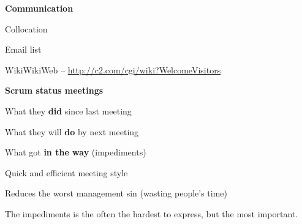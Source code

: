 \documentclass[landscape]{slides}
\renewcommand{\title}[1]{{\large\bfseries #1}}
\newenvironment{itemiz}%
  {\begin{list}{}{\raggedright
      \setlength{\itemsep}{2pt}%
      \setlength{\parskip}{4pt}\setlength{\parsep}{2pt}}}%
  {\end{list}}%
\begin{document}
 \begin{slide}
  \title{Communication}
  \begin{itemiz}
  \item Collocation
  \item Email list
  \item WikiWikiWeb --  \url{http://c2.com/cgi/wiki?WelcomeVisitors}
  \end{itemiz}
  \title{Scrum status meetings}
  \begin{itemiz}
  \item What they {\bf did} since last meeting
  \item What they will {\bf do} by next meeting
  \item What got {\bf in the way} (impediments)
  \end{itemiz}
  \begin{itemiz}
    \item Quick and efficient meeting style
    \item Reduces the worst management sin (wasting people's time)
    \item The impediments is the often the hardest to express, but the
    most important.
  \end{itemiz}
 \end{slide}
 
\end{document}
